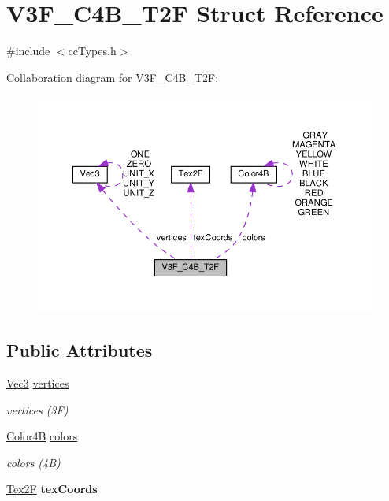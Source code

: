 \hypertarget{structV3F__C4B__T2F}{}\section{V3\+F\+\_\+\+C4\+B\+\_\+\+T2F Struct Reference}
\label{structV3F__C4B__T2F}


{\ttfamily \#include $<$cc\+Types.\+h$>$}



Collaboration diagram for V3\+F\+\_\+\+C4\+B\+\_\+\+T2F\+:
\nopagebreak
\begin{figure}[H]
\begin{center}
\leavevmode
\includegraphics[width=350pt]{structV3F__C4B__T2F__coll__graph}
\end{center}
\end{figure}
\subsection*{Public Attributes}
\begin{DoxyCompactItemize}
\item 
\mbox{\label{structV3F__C4B__T2F_a111d166d6c2d1718c829ac08521d9a60}} 
\hyperlink{classVec3}{Vec3} \hyperlink{structV3F__C4B__T2F_a111d166d6c2d1718c829ac08521d9a60}{vertices}
\begin{DoxyCompactList}\small\item\em vertices (3F) \end{DoxyCompactList}\item 
\mbox{\label{structV3F__C4B__T2F_abcfb8a6272430d076bbb4061d1f5bcd2}} 
\hyperlink{structColor4B}{Color4B} \hyperlink{structV3F__C4B__T2F_abcfb8a6272430d076bbb4061d1f5bcd2}{colors}
\begin{DoxyCompactList}\small\item\em colors (4B) \end{DoxyCompactList}\item 
\mbox{\label{structV3F__C4B__T2F_af5ec6a35d258ec7ee24c2900f60d70a4}} 
\hyperlink{structTex2F}{Tex2F} {\bfseries tex\+Coords}
\end{DoxyCompactItemize}


